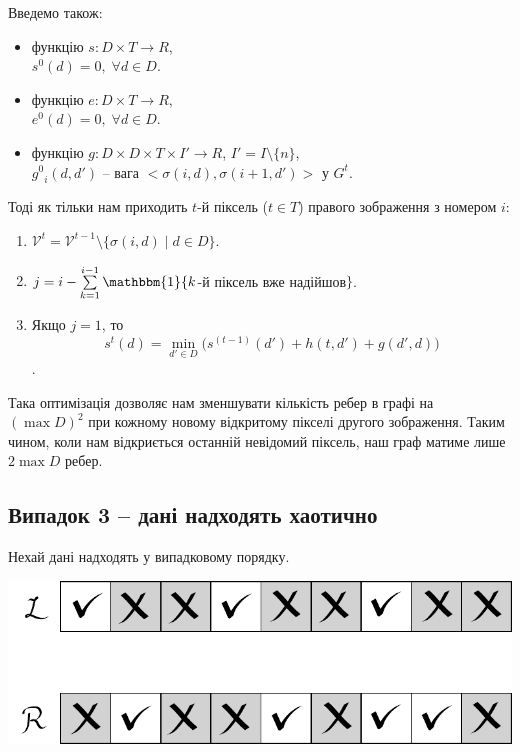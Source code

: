 \documentclass{ConfFTI}
\begin{document}
Введемо також:
\begin{itemize}
\item функцію $ s: D \times T \rightarrow R $, \\
	${s^0}(d) = 0, \; \forall d \in D $.
\item функцію $ e: D \times T \rightarrow R $, \\
	${e^0}(d) = 0, \; \forall d \in D $.
\item функцію $ g: D \times D \times T \times I' \rightarrow R $, $I' = I \setminus \{n\}$, \\
	${g^0}_i(d, d')$ -- вага $<\sigma(i, d), \sigma(i+1, d')> $ у $G^t$.\\
\end{itemize}

Тоді як тільки нам приходить $t$-й піксель ($ t \in T $) правого зображення з номером $i$:
\begin{enumerate}
	\item 
		$\mathcal{V}^t = \mathcal{V}^{t-1} \setminus \{ \sigma(i, d) \; | \; d \in D \}.$
	\item 
		$j = i - \sum\limits_{k=1}^{i-1} \mathbbm{1}\{k$-й піксель вже надійшов$\}$.
	\item 
		Якщо $j = 1$, то 
		$${s^t}(d) =  \min\limits_{d' \in D} \big( s^{(t-1)}(d') + h(t, d') + g(d', d) \big)$$.
\end{enumerate}


Така оптимізація дозволяє нам зменшувати кількість ребер в графі на  $(\max{D})^2$ при кожному новому відкритому пікселі другого зображення. Таким чином, коли нам відкриється останній невідомий піксель, наш граф матиме лише $2 \max{D}$ ребер.

\subsection{Випадок 3 -- дані надходять хаотично} 

Нехай дані надходять у випадковому порядку.

\begin{center}
\includegraphics[scale = 0.5]{chaotic.pdf}
\end{center}
	
\end{document}
